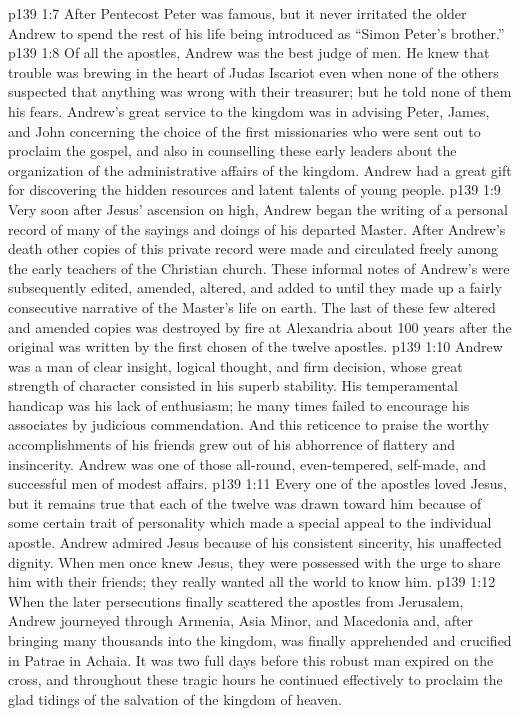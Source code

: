 \vs p139 1:7 After Pentecost Peter was famous, but it never irritated the older Andrew to spend the rest of his life being introduced as “Simon Peter’s brother.”
\vs p139 1:8 \pc Of all the apostles, Andrew was the best judge of men. He knew that trouble was brewing in the heart of Judas Iscariot even when none of the others suspected that anything was wrong with their treasurer; but he told none of them his fears. Andrew’s great service to the kingdom was in advising Peter, James, and John concerning the choice of the first missionaries who were sent out to proclaim the gospel, and also in counselling these early leaders about the organization of the administrative affairs of the kingdom. Andrew had a great gift for discovering the hidden resources and latent talents of young people.
\vs p139 1:9 Very soon after Jesus’ ascension on high, Andrew began the writing of a personal record of many of the sayings and doings of his departed Master. After Andrew’s death other copies of this private record were made and circulated freely among the early teachers of the Christian church. These informal notes of Andrew’s were subsequently edited, amended, altered, and added to until they made up a fairly consecutive narrative of the Master’s life on earth. The last of these few altered and amended copies was destroyed by fire at Alexandria about 100 years after the original was written by the first chosen of the twelve apostles.
\vs p139 1:10 Andrew was a man of clear insight, logical thought, and firm decision, whose great strength of character consisted in his superb stability. His temperamental handicap was his lack of enthusiasm; he many times failed to encourage his associates by judicious commendation. And this reticence to praise the worthy accomplishments of his friends grew out of his abhorrence of flattery and insincerity. Andrew was one of those all\hyp{}round, even\hyp{}tempered, self\hyp{}made, and successful men of modest affairs.
\vs p139 1:11 \pc Every one of the apostles loved Jesus, but it remains true that each of the twelve was drawn toward him because of some certain trait of personality which made a special appeal to the individual apostle. Andrew admired Jesus because of his consistent sincerity, his unaffected dignity. When men once knew Jesus, they were possessed with the urge to share him with their friends; they really wanted all the world to know him.
\vs p139 1:12 \pc When the later persecutions finally scattered the apostles from Jerusalem, Andrew journeyed through Armenia, Asia Minor, and Macedonia and, after bringing many thousands into the kingdom, was finally apprehended and crucified in Patrae in Achaia. It was two full days before this robust man expired on the cross, and throughout these tragic hours he continued effectively to proclaim the glad tidings of the salvation of the kingdom of heaven.

